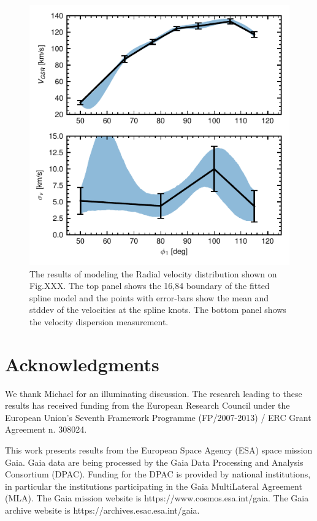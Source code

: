 \documentclass[a4paper,useAMS,usenatbib]{mnras}
\begin{document}
\begin{figure}
\includegraphics{orphan_rv_meas.pdf}
\caption{The results of modeling the Radial velocity distribution shown on Fig.XXX. The top panel shows the 16,84 boundary of the fitted spline model and 
the points with error-bars show the mean and stddev of the velocities at the spline knots. The bottom panel shows the velocity dispersion measurement. }
\label{fig:hrv_model}
\end{figure}

%


\section*{Acknowledgments}

We thank Michael for an illuminating discussion. The research leading
to these results has received funding from the European Research
Council under the European Union's Seventh Framework Programme
(FP/2007-2013) / ERC Grant Agreement n. 308024.

This work presents results from the European Space Agency (ESA) space
mission Gaia. Gaia data are being processed by the Gaia Data
Processing and Analysis Consortium (DPAC). Funding for the DPAC is
provided by national institutions, in particular the institutions
participating in the Gaia MultiLateral Agreement (MLA). The Gaia
mission website is https://www.cosmos.esa.int/gaia. The Gaia archive
website is https://archives.esac.esa.int/gaia.




\label{lastpage}
\end{document}
